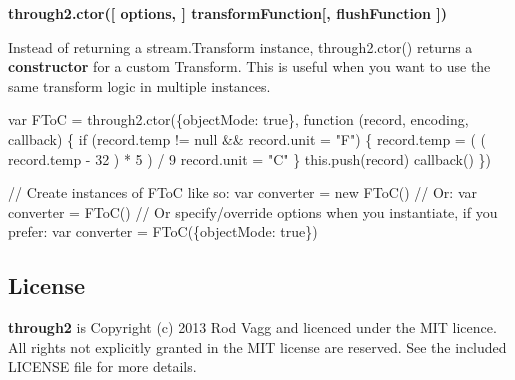 {\bfseries {\ttfamily through2.\+ctor(\mbox{[} options, \mbox{]} transform\+Function\mbox{[}, flush\+Function \mbox{]})}}

Instead of returning a {\ttfamily stream.\+Transform} instance, {\ttfamily through2.\+ctor()} returns a {\bfseries constructor} for a custom Transform. This is useful when you want to use the same transform logic in multiple instances.


\begin{DoxyCode}
var FToC = through2.ctor(\{objectMode: true\}, function (record, encoding, callback) \{
  if (record.temp != null && record.unit = "F") \{
    record.temp = ( ( record.temp - 32 ) * 5 ) / 9
    record.unit = "C"
  \}
  this.push(record)
  callback()
\})

// Create instances of FToC like so:
var converter = new FToC()
// Or:
var converter = FToC()
// Or specify/override options when you instantiate, if you prefer:
var converter = FToC(\{objectMode: true\})
\end{DoxyCode}


\subsection*{License}

{\bfseries through2} is Copyright (c) 2013 Rod Vagg \href{https://twitter.com/rvagg}{\tt } and licenced under the M\+IT licence. All rights not explicitly granted in the M\+IT license are reserved. See the included L\+I\+C\+E\+N\+SE file for more details. 